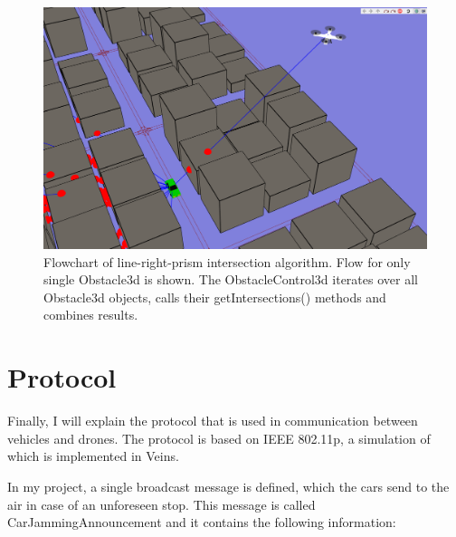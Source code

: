 \documentclass[]{nsm-thesis}
\begin{document}
\begin{figure}
	\centering
	\includegraphics[width=1\textwidth]{figures/ObstacleShadowingVisualizer.png}
	\caption{Flowchart of line-right-prism intersection algorithm. Flow for only single Obstacle3d is shown. The ObstacleControl3d iterates over all Obstacle3d objects, calls their getIntersections() methods and combines results.}
	\label{fig:ObstacleShadowingVisualizer}
\end{figure}



\section{Protocol}

Finally, I will explain the protocol that is used in communication between vehicles and drones. The protocol is based on IEEE 802.11p, a simulation of which is implemented in Veins. 

In my project, a single broadcast message is defined, which the cars send to the air in case of an unforeseen stop. This message is called CarJammingAnnouncement and it contains the following information:
\end{document}
